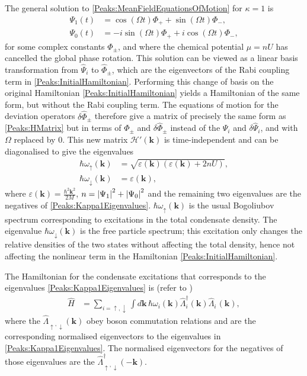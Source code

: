 The general solution to \eqref{Peaks:MeanFieldEquationsOfMotion} for $\kappa = 1$ is
\begin{subequations}
    \label{Peaks:Kappa1MeanFieldSolution}
    \begin{align}
        \Psi_1(t) &= \cos(\Omega t) \Phi_+ + \sin(\Omega t) \Phi_-, \\
        \Psi_0(t) &= -i\sin(\Omega t) \Phi_+ + i\cos(\Omega t) \Phi_-,
    \end{align}
\end{subequations}
for some complex constants $\Phi_\pm$, and where the chemical potential $\mu = n U$ has cancelled the global phase rotation. This solution can be viewed as a linear basis transformation from $\hat{\Psi}_i$ to $\hat{\Phi}_\pm$, which are the eigenvectors of the Rabi coupling term in \eqref{Peaks:InitialHamiltonian}. Performing this change of basis on the original Hamiltonian \eqref{Peaks:InitialHamiltonian} yields a Hamiltonian of the same form, but without the Rabi coupling term. The equations of motion for the deviation operators $\delta\hat{\Phi}_\pm$ therefore give a matrix of precisely the same form as \eqref{Peaks:HMatrix} but in terms of $\Phi_\pm$ and $\delta\hat{\Phi}_\pm$ instead of the $\Psi_i$ and $\delta\hat{\Psi}_i$, and with $\Omega$ replaced by 0. This new matrix $\mathcal{H}'(\bm{k})$ is time-independent and can be diagonalised to give the eigenvalues
\begin{subequations}
    \label{Peaks:Kappa1Eigenvalues}
    \begin{align}
        \hbar \omega_\uparrow(\bm{k}) &= \sqrt{\varepsilon(\bm{k})\left(\varepsilon(\bm{k}) + 2 n U\right)},\\
        \hbar \omega_\downarrow(\bm{k}) &= \varepsilon(\bm{k}),
    \end{align}
\end{subequations}
where $\displaystyle\varepsilon(\bm{k}) = \frac{\hbar^2\bm{k}^2}{2M}$, $n= \left|\Psi_1\right|^2 + \left|\Psi_0\right|^2$ and the remaining two eigenvalues are the negatives of \eqref{Peaks:Kappa1Eigenvalues}. $\hbar \omega_\uparrow(\bm{k})$ is the usual Bogoliubov spectrum \citep{Bogoliubov:1947} corresponding to excitations in the total condensate density. The eigenvalue $\hbar \omega_\downarrow(\bm{k})$ is the free particle spectrum; this excitation only changes the relative densities of the two states without affecting the total density, hence not affecting the nonlinear term in the Hamiltonian \eqref{Peaks:InitialHamiltonian}.

The Hamiltonian for the condensate excitations that corresponds to the eigenvalues \eqref{Peaks:Kappa1Eigenvalues} is (refer to )
\begin{align}
    \hat{H} &= \sum_{i=\uparrow,\downarrow}\int d\bm{k}\, \hbar \omega_i(\bm{k}) \hat{\Lambda}_i^\dagger(\bm{k}) \hat{\Lambda}_i^{\phantom{\dagger}}(\bm{k}),
\end{align}
where the $\hat{\Lambda}_{\uparrow,\downarrow}(\bm{k})$ obey boson commutation relations and are the corresponding normalised eigenvectors to the eigenvalues in \eqref{Peaks:Kappa1Eigenvalues}. The normalised eigenvectors for the negatives of those eigenvalues are the $\hat{\Lambda}_{\uparrow, \downarrow}^\dagger(-\bm{k})$.

